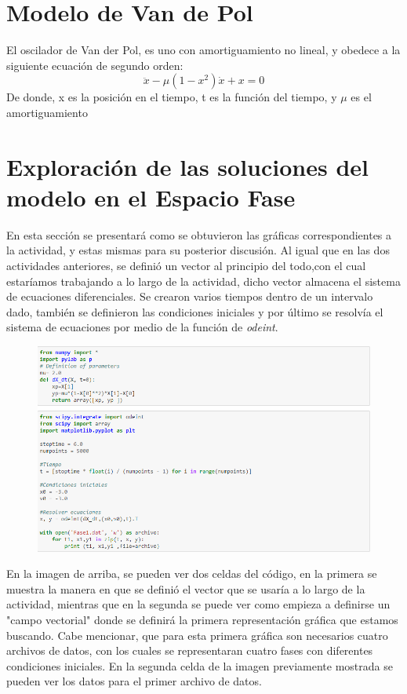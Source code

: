 \documentclass{article}
\begin{document}
\section {Modelo de Van de Pol}
El oscilador de Van der Pol, es uno con amortiguamiento no lineal, y obedece a la siguiente ecuación de segundo orden:
\begin{equation}
\ddot x -\mu (1-x^2) \dot x +x = 0
\end{equation}
De donde, x es la posición en el tiempo, t es la función del tiempo, y $\mu$ es el amortiguamiento

\section {Exploración de las soluciones del modelo en el Espacio Fase}
En esta sección se presentará como se obtuvieron las gráficas correspondientes a la actividad, y estas mismas para su posterior discusión.
Al igual que en las dos actividades anteriores, se definió un vector al principio del todo,con el cual estaríamos trabajando a lo largo de la actividad, dicho vector almacena el sistema de ecuaciones diferenciales. Se crearon varios tiempos dentro de un intervalo dado, también se definieron las condiciones iniciales y por último se resolvía el sistema de ecuaciones por medio de la función de \textit{odeint}.
\begin{figure}[H]
    \includegraphics[width=1\textwidth]{Celda1.PNG}
    \centering
    \label{Cod}
\end{figure}
En la imagen de arriba, se pueden ver dos celdas del código, en la primera se muestra la manera en que se definió el vector que se usaría a lo largo de la actividad, mientras que en la segunda se puede ver como empieza a definirse un "campo vectorial" donde se definirá la primera representación gráfica que estamos buscando. Cabe mencionar, que para esta primera gráfica son necesarios cuatro archivos de datos, con los cuales se representaran cuatro fases con diferentes condiciones iniciales. En la segunda celda de la imagen previamente mostrada se pueden ver los datos para el primer archivo de datos.
\end{document}
